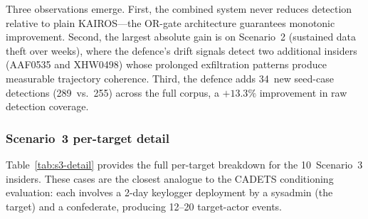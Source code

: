 \documentclass[10pt,twocolumn]{article}
\begin{document}
Three observations emerge.  First, the combined system never reduces
detection relative to plain KAIROS---the OR-gate architecture guarantees
monotonic improvement.  Second, the largest absolute gain is on Scenario~2
(sustained data theft over weeks), where the defence's drift signals
detect two additional insiders (AAF0535 and XHW0498) whose prolonged
exfiltration patterns produce measurable trajectory coherence.  Third,
the defence adds 34~new seed-case detections (289~vs.~255) across the
full corpus, a $+13.3\%$ improvement in raw detection coverage.

\subsubsection{Scenario~3 per-target detail}

Table~\ref{tab:s3-detail} provides the full per-target breakdown for the
10~Scenario~3 insiders.  These cases are the closest analogue to the
CADETS conditioning evaluation: each involves a 2-day keylogger deployment
by a sysadmin (the target) and a confederate, producing 12--20
target-actor events.

\begin{table}[htbp]
\centering
\caption{Scenario~3 per-target detection across 5~seeds.  Each cell shows
the number of seeds that detect the attack window.  ``Plain'' = adapted
KAIROS q99.  Defence shown for the primary CUSUM configuration
(hierarchical LDAP, median shrinkage, cosine, weighted mean).
\textbf{Bold} entries show where the defence provides unique detection
(detects in $\geq 1$ seed where plain KAIROS does not).}
\label{tab:s3-detail}
\end{table}
\end{document}
